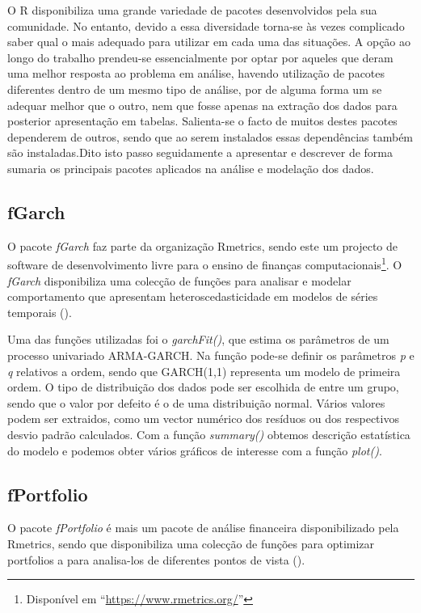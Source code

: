 \documentclass[
  12pt,
  a4paper,
  openany]{book}
\begin{document}
O R disponibiliza uma grande variedade de pacotes desenvolvidos pela sua comunidade. No entanto, devido a essa diversidade torna-se às vezes complicado saber qual o mais adequado para utilizar em cada uma das situações. A opção ao longo do trabalho prendeu-se essencialmente por optar por aqueles que deram uma melhor resposta ao problema em análise, havendo utilização de pacotes diferentes dentro de um mesmo tipo de análise, por de alguma forma um se adequar melhor que o outro, nem que fosse apenas na extração dos dados para posterior apresentação em tabelas. Salienta-se o facto de muitos destes pacotes dependerem de outros, sendo que ao serem instalados essas dependências também são instaladas.Dito isto passo seguidamente a apresentar e descrever de forma sumaria os principais pacotes aplicados na análise e modelação dos dados.

\hypertarget{fgarch}{%
\subsection{fGarch}\label{fgarch}}

O pacote \emph{fGarch} faz parte da organização Rmetrics, sendo este um projecto de software de desenvolvimento livre para o ensino de finanças computacionais\footnote{Disponível em ``\url{https://www.rmetrics.org/}''}. O \emph{fGarch} disponibiliza uma colecção de funções para analisar e modelar comportamento que apresentam heteroscedasticidade em modelos de séries temporais (\citet{fGarch}).

Uma das funções utilizadas foi o \emph{garchFit()}, que estima os parâmetros de um processo univariado ARMA-GARCH. Na função pode-se definir os parâmetros \emph{p} e \emph{q} relativos a ordem, sendo que GARCH(1,1) representa um modelo de primeira ordem. O tipo de distribuição dos dados pode ser escolhida de entre um grupo, sendo que o valor por defeito é o de uma distribuição normal. Vários valores podem ser extraidos, como um vector numérico dos resíduos ou dos respectivos desvio padrão calculados. Com a função \emph{summary()} obtemos descrição estatística do modelo e podemos obter vários gráficos de interesse com a função \emph{plot()}.

\hypertarget{fportfolio}{%
\subsection{fPortfolio}\label{fportfolio}}

O pacote \emph{fPortfolio} é mais um pacote de análise financeira disponibilizado pela Rmetrics, sendo que disponibiliza uma colecção de funções para optimizar portfolios a para analisa-los de diferentes pontos de vista (\citet{fPortfolio}).
\end{document}
